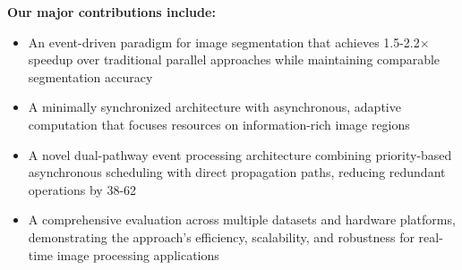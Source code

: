 \documentclass[conference]{IEEEtran}
\begin{document}
\textbf{Our major contributions include:}
\begin{itemize}
\item An event-driven paradigm for image segmentation that achieves 1.5-2.2$\times$ speedup over traditional parallel approaches while maintaining comparable segmentation accuracy
\item A minimally synchronized architecture with asynchronous, adaptive computation that focuses resources on information-rich image regions
\item A novel dual-pathway event processing architecture combining priority-based asynchronous scheduling with direct propagation paths, reducing redundant operations by 38-62%
\item A comprehensive evaluation across multiple datasets and hardware platforms, demonstrating the approach's efficiency, scalability, and robustness for real-time image processing applications
\end{itemize}
\end{document}
